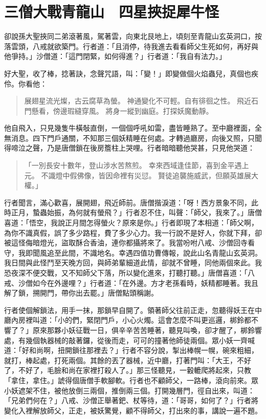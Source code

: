 
\chapter{三僧大戰青龍山　四星挾捉犀牛怪}

卻說孫大聖挾同二弟滾著風，駕著雲，向東北艮地上，頃刻至青龍山玄英洞口，按落雲頭，八戒就欲築門。行者道：「且消停，待我進去看看師父生死如何，再好與他爭持。」沙僧道：「這門閉緊，如何得進？」行者道：「我自有法力。」

好大聖，收了棒，捻著訣，念聲咒語，叫：「變！」即變做個火焰蟲兒，真個也疾伶。你看他：
\begin{quote}
展翅星流光燦，古云腐草為螢。
神通變化不可輕。自有徘徊之性。
飛近石門懸看，傍邊瑕縫穿風。
將身一縱到幽庭。打探妖魔動靜。
\end{quote}

他自飛入，只見幾隻牛橫敧直倒，一個個呼吼如雷，盡皆睡熟了。至中廳裡面，全無消息。四下門戶通關，不知那三個妖精睡在何處。才轉過廳房，向後又照，只聞得啼泣之聲，乃是唐僧鎖在後房簷柱上哭哩。行者暗暗聽他哭甚，只見他哭道：
\begin{quote}
「一別長安十數年，登山涉水苦熬煎。
幸來西域逢佳節，喜到金平遇上元。
不識燈中假佛像，皆因命裡有災愆。
賢徒追襲施威武，但願英雄展大權。」
\end{quote}

行者聞言，滿心歡喜，展開翅，飛近師前。唐僧揩淚道：「呀！西方景象不同，此時正月，蟄蟲始振，為何就有螢飛？」行者忍不住，叫聲：「師父，我來了。」唐僧喜道：「悟空，我說正月間怎得螢火？原來是你。」行者即現了本相道：「師父啊，為你不識真假，誤了多少路程，費了多少心力。我一行說不是好人，你就下拜，卻被這怪侮暗燈光，盜取酥合香油，連你都攝將來了。我當吩咐八戒、沙僧回寺看守，我即聞風追至此間，不識地名。幸遇四值功曹傳報，說此山名青龍山玄英洞。我日間與此怪鬥至天晚方回，與師弟輩細道此情，卻就不曾睡，同他兩個來此。我恐夜深不便交戰，又不知師父下落，所以變化進來，打聽打聽。」唐僧喜道：「八戒、沙僧如今在外邊哩？」行者道：「在外邊。方才老孫看時，妖精都睡著。我且解了鎖，搠開門，帶你出去罷。」唐僧點頭稱謝。

行者使個解鎖法，用手一抹，那鎖早自開了。領著師父往前正走，忽聽得妖王在中廳內房裡叫道：「小的們，緊閉門戶，小心火燭。這會怎麼不叫更巡邏，梆鈴都不響了？」原來那夥小妖征戰一日，俱辛辛苦苦睡著，聽見叫喚，卻才醒了，梆鈴響處，有幾個執器械的敲著鑼，從後而走，可可的撞著他師徒兩個。眾小妖一齊喊道：「好和尚啊，扭開鎖往那裡去？」行者不容分說，掣出棒幌一幌，碗來粗細，就打，棒起處，打死兩個。其餘的丟了器械，近中廳，打著門叫：「大王，不好了，不好了，毛臉和尚在家裡打殺人了。」那三怪聽見，一轂轆爬將起來，只教「拿住，拿住。」諕得個唐僧手軟腳軟。行者也不顧師父，一路棒，滾向前來。眾小妖遮架不住，被他放倒三兩個，推倒兩三個。打開幾層門，徑自出來，叫道：「兄弟們何在？」八戒、沙僧正舉著鈀、杖等待，道：「哥哥，如何了？」行者將變化入裡解放師父，正走，被妖驚覺，顧不得師父，打出來的事，講說一遍不題。

